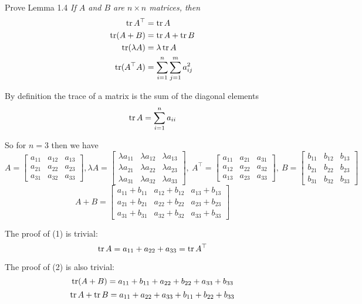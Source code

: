 
\begin{homeworkProblem}
  Prove Lemma 1.4 \textit{If $A$ and $B$ are $n \times n$ matrices, then}
\begin{align}
  \operatorname{tr} A^\top      &= \operatorname{tr} A\\
  \operatorname{tr}(A + B)      &= \operatorname{tr} A + \operatorname{tr} B\\
  \operatorname{tr}(\lambda A)  &= \lambda \operatorname{tr} A\\
  \operatorname{tr}(A^\top A)   &= \sum_{i=1}^n \sum_{j=1}^m a^2_{ij}
\end{align}

\solution

By definition the trace of a matrix is the sum of the diagonal elements
\[
  \operatorname{tr} A = \sum_{i=1}^n a_{ii}
\]

So for $n = 3$ then we have
\[
  A = \begin{bmatrix}
  a_{11} & a_{12} & a_{13}\\
  a_{21} & a_{22} & a_{23}\\
  a_{31} & a_{32} & a_{33}
\end{bmatrix}, \lambda A = \begin{bmatrix}
\lambda a_{11} & \lambda a_{12} & \lambda a_{13}\\
\lambda a_{21} & \lambda a_{22} & \lambda a_{23}\\
\lambda a_{31} & \lambda a_{32} & \lambda a_{33}
\end{bmatrix},\ A^\top = \begin{bmatrix}
a_{11} & a_{21} & a_{31}\\
a_{12} & a_{22} & a_{32}\\
a_{13} & a_{23} & a_{33}
\end{bmatrix}, \ B = \begin{bmatrix}
b_{11} & b_{12} & b_{13}\\
b_{21} & b_{22} & b_{23}\\
b_{31} & b_{32} & b_{33}
\end{bmatrix}
\]
\[
A + B = \begin{bmatrix}
a_{11} + b_{11} & a_{12} + b_{12} & a_{13} + b_{13}\\
a_{21} + b_{21} & a_{22} + b_{22} & a_{23} + b_{23}\\
a_{31} + b_{31} & a_{32} + b_{32} & a_{33} + b_{33}
\end{bmatrix}
\]

The proof of (1) is trivial:
\[
  \operatorname{tr} A = a_{11} + a_{22} + a_{33} = \operatorname{tr} A^\top
\]

The proof of (2) is also trivial:
\[
  \operatorname{tr} (A+B) = a_{11} + b_{11} + a_{22} + b_{22} + a_{33} + b_{33}
\]
\[
  \operatorname{tr} A + \operatorname{tr} B = a_{11} + a_{22} + a_{33} + b_{11} + b_{22} + b_{33}
\]


\end{homeworkProblem}
